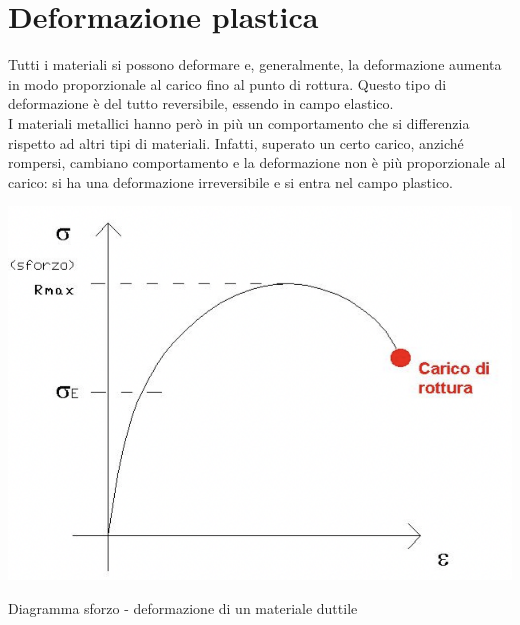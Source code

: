 \setchapterpreamble[u]{\margintoc}
\chapter{Deformazione plastica}

Tutti i materiali si possono deformare e, generalmente, la deformazione aumenta in modo proporzionale al carico fino al punto di rottura. Questo tipo di deformazione è del tutto reversibile, essendo in campo elastico.\\
I materiali metallici hanno però in più un comportamento che si differenzia rispetto ad altri tipi di materiali. Infatti, superato un certo carico, anziché rompersi, cambiano comportamento e la deformazione non è più proporzionale al carico: si ha una deformazione irreversibile e si entra nel campo plastico.

\begin{marginfigure}[-5cm]
\includegraphics{images/img28.png}
\caption{Diagramma sforzo - deformazione di un materiale duttile}
\end{marginfigure}

